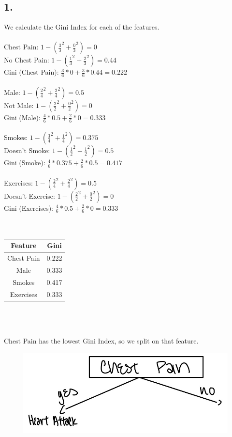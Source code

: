 \documentclass[12pt, letterpaper]{article}
\begin{document}
\subsection*{1.} We calculate the Gini Index for each of the features.\\\\
Chest Pain: $1-(\frac{3}{3}^2+\frac{0}{3}^2) = 0$\\
No Chest Pain: $1-(\frac{1}{3}^2+\frac{2}{3}^2) = 0.44$\\
Gini (Chest Pain): $\frac{3}{6}*0 + \frac{3}{6}*0.44 = 0.222$\\\\
Male: $1-(\frac{2}{4}^2+\frac{2}{4}^2) = 0.5$\\
Not Male: $1-(\frac{2}{2}^2+\frac{0}{2}^2) = 0$\\
Gini (Male): $\frac{4}{6}*0.5 + \frac{2}{6}*0 = 0.333$\\\\
Smokes: $1-(\frac{3}{4}^2+\frac{1}{4}^2) = 0.375$\\
Doesn't Smoke: $1-(\frac{1}{2}^2+\frac{1}{2}^2) = 0.5$\\
Gini (Smoke): $\frac{4}{6}*0.375 + \frac{2}{6}*0.5 = 0.417$\\\\
Exercises: $1-(\frac{2}{4}^2+\frac{2}{4}^2) = 0.5$\\
Doesn't Exercise: $1-(\frac{2}{2}^2+\frac{0}{2}^2) = 0$\\
Gini (Exercises): $\frac{4}{6}*0.5 + \frac{2}{6}*0 = 0.333$\\\\
\\
\begin{tabular}{ |c|c| } 
 \hline
 \textbf{Feature} & \textbf{Gini} \\ 
\hline
Chest Pain & 0.222 \\ 
\hline
Male & 0.333 \\ 
\hline
Smokes & 0.417 \\ 
 \hline
Exercises & 0.333 \\ 
 \hline
\end{tabular}\\\\
\\
Chest Pain has the lowest Gini Index, so we split on that feature.\\
\begin{figure}[h!]
  \includegraphics[scale=0.3]{./images/3.1_one}
\end{figure} \\
\end{document}
